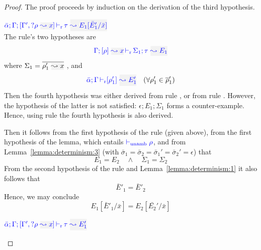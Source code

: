 \begin{proof}
The proof proceeds by induction on the derivation of the third hypothesis.
\begin{description}
\setlength{\itemsep}{1em}
\item[\fbox{\rref{L-RuleMatch}}]\quad$\dlres{\bar{\alpha}}{\tenv}{\tenv',\envi{\rulet}{x}}{\type}{E_1[\bar{E}'_1/\bar{x}]}$\\

  The rule's two hypotheses are
\begin{equation*}
\dmres{\tenv}{\rulet}{x}{\tau}{E_1}{\Sigma_1}
\end{equation*}%
where $\Sigma_1 = \overline{\rulet'_1~\gbox{\leadsto x}}$ , 
  and
\begin{equation*}
\drres{\bar{\alpha}}{\tenv}{\rulet'_1}{E'_1} \quad (\forall \rulet'_1 \in \overline{\rulet}'_1)
\end{equation*}%
  Then the fourth hypothesis was either derived from rule ,
  or from rule . However, the hypothesis of the latter is
  not satisfied: $\epsilon;E_1;\Sigma_1$ forms a counter-example. Hence, using rule 
  the fourth hypothesis is also derived.

  Then it follows from the first hypothesis of the rule (given above),
  from the first hypothesis of the lemma, which entails ${\color{blue}  \vdash_{\mathrm{unamb}} \rho}$,  
  and from Lemma~\ref{lemma:determinism:3} (with $\bar{\sigma}_1 = \bar{\sigma}_2 = \bar{\sigma}_1' = \bar{\sigma}_2' = \epsilon$) that
\begin{equation*}
  E_1 = E_2 \quad\wedge\quad \Sigma_1 = \Sigma_2
\end{equation*}
  From the second hypothesis of the rule and Lemma~\ref{lemma:determinism:1} it also follows that
\begin{equation*}
  \bar{E}'_1 = \bar{E}'_2
\end{equation*}
  Hence, we may conclude
\begin{equation*}
  E_1[\bar{E}'_1/\bar{x}] = E_2[\bar{E_2}'/\bar{x}]
\end{equation*}


\item[\fbox{\rref{L-RuleNoMatch}}]\quad$\dlres{\bar{\alpha}}{\tenv}{\tenv',\envi{\rulet}{x}}{\type}{E_1'}$\\


\end{description}
\end{proof}
